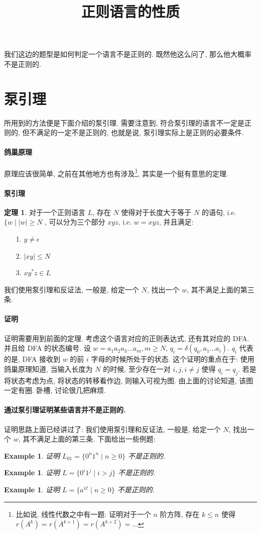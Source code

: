 \documentclass[12pt]{ctexart}
\theoremstyle{definition}
\theoremstyle{definition}
\newtheorem{thm}[definition]{定理}
\theoremstyle{plain}
\newtheorem{exam}[definition]{Example}
\theoremstyle{remark}
\begin{document}
\title{正则语言的性质}
我们这边的题型是如何判定一个语言不是正则的. 既然他这么问了, 那么他大概率不是正则的. 
\section{泵引理}\label{sec:beng}
所用到的方法便是下面介绍的泵引理. 需要注意到, 符合泵引理的语言不一定是正则的, 但不满足的一定不是正则的, 也就是说, 泵引理实际上是正则的必要条件. 
\paragraph{鸽巢原理}
原理应该很简单, 之前在其他地方也有涉及\footnote{比如说, 线性代数之中有一题: 证明对于一个 \(n\) 阶方阵, 存在 \(k \le n\) 使得 \(r (A ^{k} )= r (A ^{k + 1} ) = r (A ^{k + 2} ) = \dots\)}, 其实是一个挺有意思的定理. 

\paragraph{泵引理}
\begin{thm}
对于一个正则语言 \(L\), 存在 \(N\) 使得对于长度大于等于 \(N\) 的语句, i.e. \(\{ w \mid |w | \ge N\) , 可以分为三个部分 \(xyz\), i.e. \(w = xyz\), 并且满足: 
\begin{itemize}
\item [1.] \(y \ne \epsilon\) 
\item [2.] \(|xy | \le N\)
\item [3.] \(x y^{*} z \in L\) 
\end{itemize}
\end{thm}
我们使用泵引理和反证法, 一般是, 给定一个 \(N\), 找出一个 \(w\), 其不满足上面的第三条. 
\paragraph{证明}
证明需要用到前面的定理.  考虑这个语言对应的正则表达式, 还有其对应的 DFA. 并且给 DFA 的状态编号. 
设 \(w = a_{1} a_{2} a_{3} \dots a_{m}, m \ge N\), \(q_{i} = \hat{\delta} (q_{0} , a_{1} \dots a_{i})\). \(q_{i}\) 代表的是, DFA 接收到 \(w\) 的前 \(i\) 字母的时候所处于的状态. 这个证明的重点在于: 使用鸽巢原理知道, 当输入长度为 \(N\) 的时候, 至少存在一对 \(i, j , i \ne j\) 使得 \(q_{i} = q_{j}\). 
若是将状态考虑为点, 将状态的转移看作边, 则输入可视为图. 由上面的讨论知道, 该图一定有圈. 卧槽, 讨论很几把麻烦. 
\paragraph{通过泵引理证明某些语言并不是正则的. }
证明思路上面已经讲过了: 
我们使用泵引理和反证法, 一般是, 给定一个 \(N\), 找出一个 \(w\), 其不满足上面的第三条. 下面给出一些例题: 
\begin{exam}
证明 \(L_{01}  = \{ 0 ^{n } 1 ^{n} \mid n \ge 0\}\) 不是正则的. 
\end{exam}
\begin{exam}
证明 \(L = \{ 0 ^{i}  1 ^{j} \mid i > j \} \) 不是正则的. 
\end{exam}
\begin{exam}
证明 \(L = \{ a ^{n !} \mid n \ge 0\}\) 不是正则的. 
\end{exam}
\end{document}
